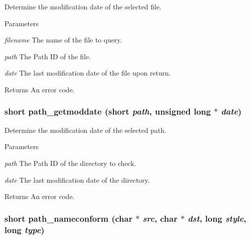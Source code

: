 Determine the modification date of the selected file. 
\begin{DoxyParams}{Parameters}
\item[{\em filename}]The name of the file to query. \item[{\em path}]The Path ID of the file. \item[{\em date}]The last modification date of the file upon return. \end{DoxyParams}
\begin{DoxyReturn}{Returns}
An error code. 
\end{DoxyReturn}
\hypertarget{group__files_ga6adeb9993cc360ea2e36a47b1a67dd95}{
\subsubsection[{path\_\-getmoddate}]{\setlength{\rightskip}{0pt plus 5cm}short path\_\-getmoddate (short {\em path}, \/  unsigned long $\ast$ {\em date})}}
\label{group__files_ga6adeb9993cc360ea2e36a47b1a67dd95}


Determine the modification date of the selected path. 
\begin{DoxyParams}{Parameters}
\item[{\em path}]The Path ID of the directory to check. \item[{\em date}]The last modification date of the directory. \end{DoxyParams}
\begin{DoxyReturn}{Returns}
An error code. 
\end{DoxyReturn}
\hypertarget{group__files_gaaf014af82bc666cd974b83441eb4c9c6}{
\subsubsection[{path\_\-nameconform}]{\setlength{\rightskip}{0pt plus 5cm}short path\_\-nameconform (char $\ast$ {\em src}, \/  char $\ast$ {\em dst}, \/  long {\em style}, \/  long {\em type})}}
\label{group__files_gaaf014af82bc666cd974b83441eb4c9c6}


